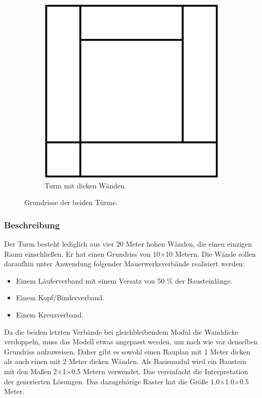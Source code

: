 \begin{figure}[ht!]
\begin{subfigure}[b]{0.35\columnwidth}
    \includegraphics[width=\columnwidth]{fig/scenario1_story_plan_thick.png}
    \caption{Turm mit dicken Wänden.}
  \end{subfigure}
  \hspace*{\fill}%
  \caption{Grundrisse der beiden Türme.}\label{fig:scenarios:Scenario1 Gebaeudeplan}
\end{figure}


\subsubsection*{Beschreibung}
Der Turm besteht lediglich aus vier 20 Meter hohen Wänden, die einen einzigen Raum einschließen.
Er hat einen Grundriss von 10$\times$10 Metern.
Die Wände sollen daraufhin unter Anwendung folgender Mauerwerksverbände realisiert werden:
\begin{itemize}
  \item Einem Läuferverband mit einem Versatz von 50 \% der Bausteinlänge.
  \item Einem Kopf/Binderverband.
  \item Einem Kreuzverband.
\end{itemize}
Da die beiden letzten Verbände bei gleichbleibendem Modul die Wanddicke verdoppeln, muss das Modell etwas angepasst werden, um nach wie vor denselben Grundriss aufzuweisen.
Daher gibt es sowohl einen Bauplan mit 1 Meter dicken als auch einen mit 2 Meter dicken Wänden.
Als Basismodul wird ein Baustein mit den Maßen 2$\times$1$\times$0.5 Metern verwendet.
Das vereinfacht die Interpretation der generierten Lösungen.
Das dazugehörige Raster hat die Größe 1.0$\times$1.0$\times$0.5 Meter.

